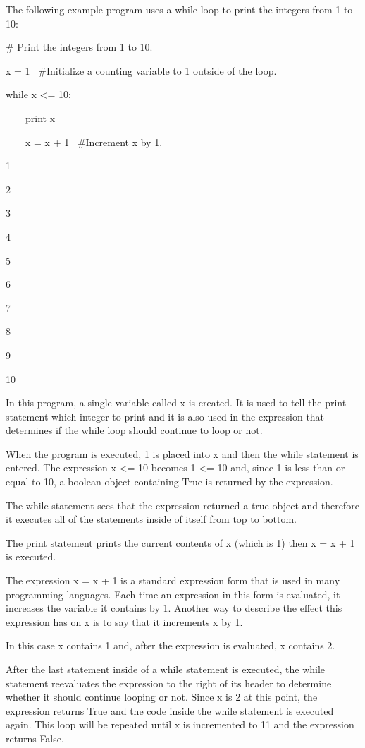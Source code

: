 \documentclass[12pt,oneside]{book}
\begin{document}
The following example program uses a while loop to print the integers from 1 to 10:


\# Print the integers from 1 to 10.


x = 1 \ \#Initialize a counting variable to 1 outside of the loop.


while x {\textless}= 10:

\ \ \ \ print x

\ \ \ \ x = x + 1 \ \#Increment x by 1.

{\textbar}

1

2

3

4

5

6

7

8

9

10

In this program, a single variable called x is created. It is used to tell the print statement which integer to print and it is also used in the expression that determines if the while loop should continue to loop or not. 

When the program is executed, 1 is placed into x and then the while statement is entered. The expression x {\textless}= 10 becomes 1 {\textless}= 10 and, since 1 is less than or equal to 10, a boolean object containing True is returned by the expression. 

The while statement sees that the expression returned a true object and therefore it executes all of the statements inside of itself from top to bottom.

The print statement prints the current contents of x (which is 1) then x = x + 1 is executed.

The expression x = x + 1 is a standard expression form that is used in many programming languages. Each time an expression in this form is evaluated, it increases the variable it contains by 1. Another way to describe the effect this expression has on x is to say that it increments x by 1. 

In this case x contains 1 and, after the expression is evaluated, x contains 2.


After the last statement inside of a while statement is executed, the while statement reevaluates the expression to the right of its header to determine whether it should continue looping or not. Since x is 2 at this point, the expression returns True and the code inside the while statement is executed again. This loop will be repeated until x is incremented to 11 and the expression returns False. 
\end{document}
